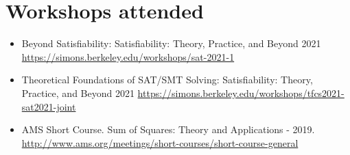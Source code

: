 \section{Workshops attended}

\begin{itemize}
  \item Beyond Satisfiability: Satisfiability: 
    Theory, Practice, and Beyond 2021 
    \url{https://simons.berkeley.edu/workshops/sat-2021-1}
  \item Theoretical Foundations of SAT/SMT Solving: 
    Satisfiability: Theory, Practice, and Beyond 2021
    \url{https://simons.berkeley.edu/workshops/tfcs2021-sat2021-joint}
  \item AMS Short Course. Sum of Squares: Theory and Applications - 2019.
    \url{http://www.ams.org/meetings/short-courses/short-course-general}
\end{itemize}

